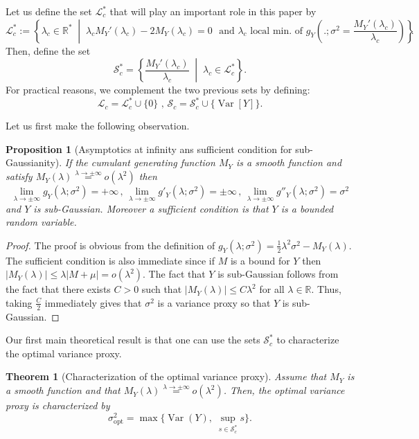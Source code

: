 \documentclass[a4paper, 10pt]{article}
\newcommand{\beq}{\begin{equation}}
\newcommand{\eeq}{\end{equation}}
\newtheorem{theorem}{Theorem}[section]
\newtheorem{proposition}{Proposition}[section]
\theoremstyle{definition}
\begin{document}
Let us define the set $\mathcal{L}_c^*$ that will play an important role in this paper by
\beq \mathcal{L}_c^*:=\left\{\lambda_c \in \mathbb{R}^* \;\middle|\;  \lambda_c M_Y'(\lambda_c)- 2M_Y(\lambda_c)=0 \,\, \text{ and }\lambda_c \text{ local min. of } g_Y\left(.;\sigma^2=\frac{ M_Y'(\lambda_c)}{\lambda_c}\right) \right\}.\eeq
Then, define the set
\beq \mathcal{S}_c^*=\left\{\frac{M_Y'(\lambda_c)}{\lambda_c}  \;\middle|\; \lambda_c\in \mathcal{L}_c^*\right\}.\eeq
For practical reasons, we complement the two previous sets by defining:
\beq \mathcal{L}_c=\mathcal{L}_c^*\cup\{0\}\,\,, \,\mathcal{S}_c=\mathcal{S}_c^*\cup\{\operatorname{Var}[Y]\}.\eeq 

Let us first make the following observation.
\begin{proposition}[Asymptotics at infinity ans sufficient condition for sub-Gaussianity]\label{AsymptInf}If the cumulant generating function $M_Y$ is a smooth function and satisfy $M_Y(\lambda)\overset{\lambda\to\pm \infty}{=}o(\lambda^2)$ then
\beq \lim_{\lambda\to \pm\infty}g_Y(\lambda;\sigma^2)=+\infty\,,\, \lim_{\lambda\to \pm\infty}g'_Y(\lambda;\sigma^2)=\pm\infty\,,\, \lim_{\lambda\to \pm\infty}g''_Y(\lambda;\sigma^2)=\sigma^2\eeq
and $Y$ is sub-Gaussian. Moreover a sufficient condition is that $Y$ is a bounded random variable.    
\end{proposition}

\begin{proof}The proof is obvious from the definition of $g_Y(\lambda;\sigma^2)=\frac{1}{2}\lambda^2\sigma^2-M_Y(\lambda)$. The sufficient condition is also immediate since if $M$ is a bound for $Y$ then
$|M_Y(\lambda)|\leq \lambda|M+\mu|=o(\lambda^2)$. The fact that $Y$ is sub-Gaussian follows from the fact that there exists $C>0$ such that $|M_Y(\lambda)|\leq C\lambda^2$ for all $\lambda\in \mathbb{R}$. Thus, taking $\frac{C}{2}$ immediately gives that $\sigma^2$ is a variance proxy so that $Y$ is sub-Gaussian.
\end{proof}


Our first main theoretical result is that one can use the sets $\mathcal{S}_c^*$ to characterize the optimal variance proxy.

\begin{theorem}[Characterization of the optimal variance proxy]\label{GeneralCharac} Assume that $M_Y$ is a smooth function and that $M_Y(\lambda)\overset{\lambda\to \pm\infty}{=}o(\lambda^2)$. Then, the optimal variance proxy is characterized by
\beq \sigma_{\mathrm{opt}}^2 = \max\big\{ \operatorname{Var}(Y),\; \sup_{s \in \mathcal{S}_c^*} s \big\}. \eeq   
\end{theorem}
\end{document}
